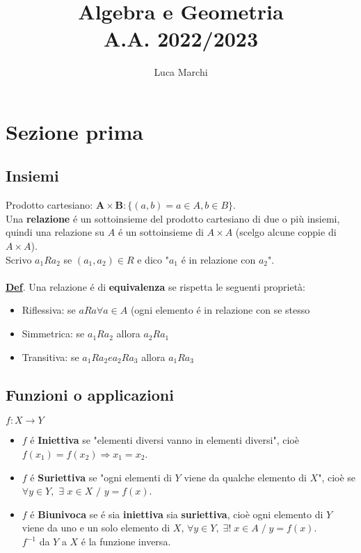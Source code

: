 \documentclass[12pt]{article}
\title{
    \textbf{Algebra e Geometria}\\
    \large A.A. 2022/2023
}
\date{}
\begin{document}
\author{Luca Marchi}
\begin{multicols*}{2}
\tableofcontents
\end{multicols*}


\maketitle

\section{Sezione prima}

\subsection{Insiemi}
Prodotto cartesiano: $ \boldsymbol{A \times B}: \{(a,b) = a \in A, b \in B\}$. \\
Una \textbf{relazione} é un sottoinsieme del prodotto cartesiano di due o più insiemi, quindi una relazione su $A$ é un sottoinsieme di $A \times A$ (scelgo alcune coppie di $A \times A$).\\
Scrivo $a_{1}Ra_{2}$ se $(a_{1}, a_{2})\in R$ e dico "$a_{1}$ é in relazione con $a_{2}$".\\\\
\underline{\textbf{Def}}. Una relazione é di \textbf{equivalenza} se rispetta le seguenti proprietà:

\begin{itemize}
    \item Riflessiva: se $aRa \forall a\in A$ (ogni elemento é in relazione con se stesso
    \item Simmetrica: se $a_{1}Ra_{2}$ allora $a_{2}Ra_{1}$
    \item Transitiva: se $a_{1}Ra_{2} e a_{2}Ra_{3}$ allora $a_{1}Ra_{3}$
\end{itemize}

\subsection{Funzioni o applicazioni}
$f : X \longrightarrow Y$

\begin{itemize}
    \item $f$ é \textbf{Iniettiva} se "elementi diversi vanno in elementi diversi", cioè $f(x_{1}) = f(x_{2}) \Rightarrow x_{1} = x_{2}$.
    \item $f$ é \textbf{Suriettiva} se "ogni elementi di $Y$ viene da qualche elemento di $X$", cioè se $\forall y\in Y,$ $\exists$ $ x\in X$ $/$ $ y = f(x)$.
    \item $f$ é \textbf{Biunivoca} se é sia \textbf{iniettiva} sia \textbf{suriettiva}, cioè ogni elemento di $Y$ viene da uno e un solo elemento di $X$, $\forall y \in Y, \;\exists! \; x \in A \;/\; y = f(x)$.\\
    $f^{-1}$ da $Y$ a $X$ é la funzione inversa.
\end{itemize}
\end{document}
